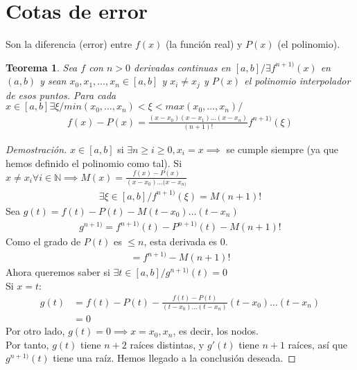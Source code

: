 \documentclass{article}
\newtheorem{teorema}{Teorema}
\begin{document}
\section{Cotas de error}
Son la diferencia (error) entre $f(x)$ (la función real) y $P(x)$
(el polinomio).
\begin{teorema}
	Sea $f$ con $n > 0$ derivadas continuas en $[a,b]/\exists f^{n+1)}(x)$ en $(a,b)$ y sean $x_0, x_1,\dots,x_n \in [a,b]$ y 
	$x_i \neq x_j$ y $P(x)$ el polinomio interpolador de esos puntos.
	Para cada $x \in [a,b] \exists \xi / min(x_0,\dots,x_n) < \xi < max(x_0,\dots,x_n)/$
	\begin{equation}
		\begin{split}
			f(x)-P(x) = \frac{(x-x_0)(x-x_1)\dots(x-x_n)}{(n+1)!}f^{n+1)}(\xi)
		\end{split}
	\end{equation}
\end{teorema}
\begin{proof}[Demostración]
	$x \in [a,b]$ si $\exists n \geq i \geq 0, x_{i} = x \implies $ se cumple siempre (ya que hemos definido el polinomio como tal).
	Si $x \neq x_{i} \forall i \in \mathbb{N} \implies
	M(x) = \frac{f(x)-P(x)}{(x-x_{0})\dots(x-x_{n)}}$
	\begin{equation}
		\begin{split}
			\exists \xi \in [a,b] / f^{n+1)}(\xi)=M(n+1)!
		\end{split}
	\end{equation}
	Sea $g(t)=f(t)-P(t) - M(t-x_{0})\dots (t-x_{n})$
	\begin{equation}
		\begin{split}
			g^{n+1)}=f^{n+1)}(t)-P^{n+1)}(t)-M(n+1)!
		\end{split}
	\end{equation}
	Como el grado de $P(t)$ es $\leq n$, esta derivada es $0$.
	\begin{equation}
		\begin{split}
			= f^{n+1)}-M(n+1)!
		\end{split}
	\end{equation}
	Ahora queremos saber si $\exists t \in[a,b] / g^{n+1)}(t)=0$\\
	Si $x=t$:
	\begin{equation}
		\begin{split}
			g(t)&=f(t)-P(t)- \frac{f(t)-P(t)}{(t-x_{0})\dots(t-x_{n})}
			(t-x_{0})\dots(t-x_{n})\\
			    &=0
		\end{split}
	\end{equation}
	Por otro lado, $g(t)=0 \implies x=x_{0},x_{n}$, es decir, los nodos.\\
	Por tanto, $g(t)$ tiene $n+2$ raíces distintas, y $g'(t)$ tiene $n+1$ raíces,
	así que $g^{n+1)}(t)$ tiene una raíz. Hemos llegado a la conclusión deseada. 
\end{proof}
\end{document}
